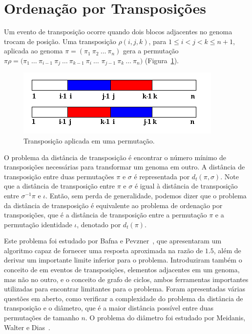 \section{Ordenação por Transposições}
\label{sec:trans}
Um evento de transposição ocorre quando dois blocos adjacentes no genoma
trocam de posição. Uma transposição $\rho(i, j, k)$, para $1 \leq i < j
< k \leq n + 1$, aplicada ao genoma $\pi =
(\pi_{1}~\pi_{2}~\ldots~\pi_{n})$ gera a permutação $\pi\rho =
(\pi_{1}~\ldots~\pi_{i-1}~\pi_{j}~\ldots~\pi_{k-1}~\pi_{i}~\ldots$
$\pi_{j-1}~\pi_{k}~\ldots~\pi_{n})$ (Figura~\ref{fig:transposition}).

\begin{figure}[h]
  \centering
  \includegraphics{images/transposition-color.png} 
  \caption{Transposição aplicada em uma permutação.}
  \label{fig:transposition}
\end{figure}

O problema da distância de transposição é encontrar o número mínimo de
transposições necessárias para transformar um genoma em outro. A
distância de transposição entre duas permutações $\pi$ e $\sigma$ é
representada por $d_{t}(\pi, \sigma)$. Note que a distância de
transposição entre $\pi$ e $\sigma$ é igual à distância de transposição
entre $\sigma^{-1} \pi$ e $\iota$. Então, sem perda de generalidade,
podemos dizer que o problema da distância de transposição é equivalente
ao problema de ordenação por transposições, que é a distância de
transposição entre a permutação $\pi$ e a permutação identidade $\iota$,
denotado por $d_{t}(\pi)$.

Este problema foi estudado por Bafna e Pevzner~\cite{BafnaPevzner*1998},
que apresentaram um algoritmo capaz de fornecer uma resposta aproximada
na razão de $1.5$, além de derivar um importante limite inferior para o
problema. Introduziram também o conceito de \bkp{} em eventos de
transposições, elementos adjacentes em um genoma, mas não no outro, e o
conceito de grafo de ciclos, ambos ferramentas importantes utilizadas
para encontrar limitantes para o problema. Foram apresentadas várias
questões em aberto, como verificar a complexidade do problema da
distância de transposição e o diâmetro, que é a maior distância possível
entre duas permutações de tamanho $n$. O problema do diâmetro foi
estudado por Meidanis, Walter e Dias~\cite{MeidanisWalterDias*1997}.

